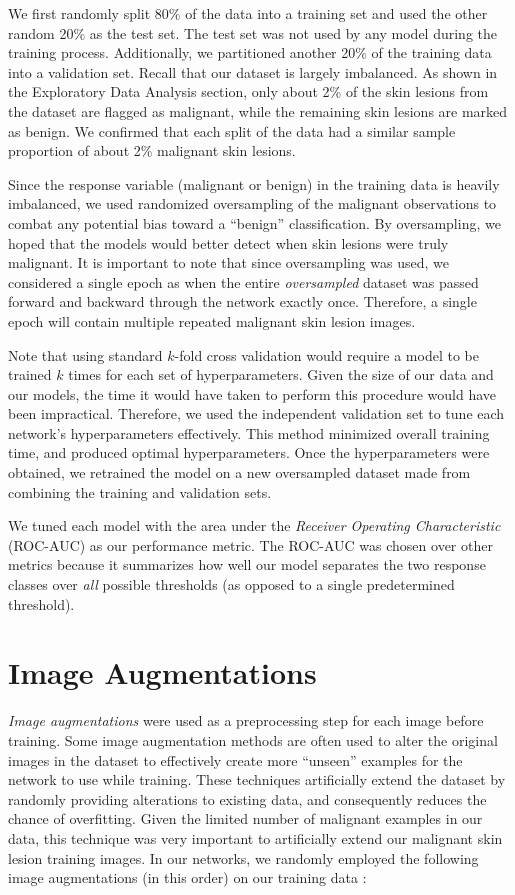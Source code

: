 \documentclass [MAS] {uclathes}
\begin{document}
We first randomly split 80\% of the data into a training set and used the other random 20\% as the test set. The test set was
not used by any model during the training process. Additionally, we partitioned another 20\% of the training data into a validation set. Recall that our dataset is largely imbalanced. As shown in the Exploratory Data Analysis section, only about 2\% of the skin lesions from the dataset are flagged as malignant, while the remaining skin lesions are marked as benign. We confirmed that each split of the data had a similar sample proportion of about 2\% malignant skin lesions.

Since the response variable (malignant or benign) in the training data is heavily imbalanced, we used randomized oversampling of the malignant observations to combat any potential bias toward a ``benign'' classification. By oversampling, we hoped that the models would better detect when skin lesions were truly malignant. It is important to note that since oversampling was used, we considered a single epoch as when the entire \textit{oversampled} dataset was passed forward and backward through the network exactly once. Therefore, a single epoch will contain multiple repeated malignant skin lesion images.

Note that using standard $k$-fold cross validation would require a model to be trained $k$ times for each set of hyperparameters. Given the size of our data and our models, the time it would have taken to perform this procedure would have been impractical. Therefore, we used the independent validation set to tune each network's hyperparameters effectively. This method minimized overall training time, and produced optimal hyperparameters. Once the hyperparameters were obtained, we retrained the model on a new oversampled dataset made from combining the training and validation sets.

We tuned each model with the area under the \textit{Receiver Operating Characteristic} (ROC-AUC) as our performance
metric. The ROC-AUC was chosen over other metrics because it summarizes how well our model separates the two response
classes over \textit{all} possible thresholds (as opposed to a single predetermined threshold). 

\section{Image Augmentations}

\textit{Image augmentations} were used as a preprocessing step for each image before training. Some image augmentation methods are often used to alter the original images in the dataset to effectively create more ``unseen'' examples for the network to use while training. These techniques artificially extend the dataset by randomly providing alterations to existing data, and consequently reduces the chance of overfitting. Given the limited number of malignant examples in our data, this technique was very important to artificially extend our malignant skin lesion training images. In our networks, we randomly employed the following image augmentations (in this order) on our training data \cite{AUG}:
\end{document}
